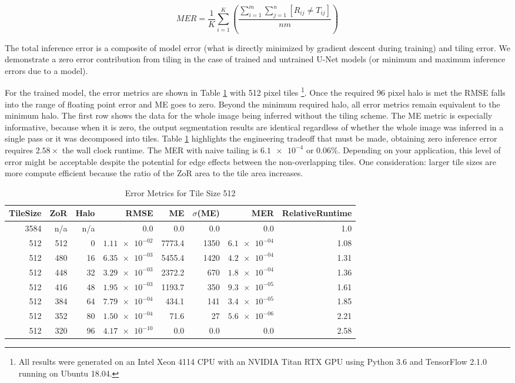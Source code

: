 \documentclass[10pt, indentfirst]{article}
\begin{document}
\begin{equation}
MER = \frac{1}{K} \sum_{i=1}^{K} \left( \frac{\sum_{i = 1}^{m} \sum_{j = 1}^{n} [ R_{ij} \neq T_{ij} ]}{nm} \right) 
\label{eq:mer}
\end{equation}

The total inference error is a composite of model error (what is directly minimized by gradient descent during training) and tiling error.
We demonstrate a zero error contribution from tiling in the case of trained and untrained U-Net models (or minimum and maximum inference errors due to a model).

For the trained model, the error metrics are shown in Table \ref{tab:tile_size_512} with 512 pixel tiles \footnote{All results were generated on an Intel Xeon 4114 CPU with an NVIDIA Titan RTX GPU using Python 3.6 and TensorFlow 2.1.0 running on Ubuntu 18.04.}.
Once the required 96 pixel halo is met the RMSE falls into the range of floating point error and ME goes to zero.
Beyond the minimum required halo, all error metrics remain equivalent to the minimum halo.
The first row shows the data for the whole image being inferred without the tiling scheme.
The ME metric is especially informative, because when it is zero, the output segmentation results are identical regardless of whether the whole image was inferred in a single pass or it was decomposed into tiles.
Table \ref{tab:tile_size_512} highlights the engineering tradeoff that must be made, obtaining zero inference error requires $2.58 \times$ the wall clock runtime.
The MER with naive tailing is $\num{6.1e-4}$ or $\num{0.06} \%$.
Depending on your application, this level of error might be acceptable despite the potential for edge effects between the non-overlapping tiles.
One consideration: larger tile sizes are more compute efficient because the ratio of the ZoR area to the tile area increases.

\begin{table}
	\centering
	\caption{Error Metrics for Tile Size 512}
	\label{tab:tile_size_512}
	\begin{tabular}{r|r|r|r|r|r|r|r}
		TileSize & ZoR & Halo & RMSE    & ME & $\sigma$(ME) & MER & RelativeRuntime \\ 
		\hline
		3584 & n/a & n/a & 0.0 & 0.0 & 0.0 & 0.0 & 1.0 \\
		512 & 512 & 0 & $\num{1.11e-02}$ & 7773.4 & 1350 & $\num{6.1e-04}$ & 1.08 \\
		512 & 480 & 16 & $\num{6.35e-03}$ & 5455.4 & 1420 & $\num{4.2e-04}$ & 1.31 \\
		512 & 448 & 32 & $\num{3.29e-03}$ & 2372.2 & 670 & $\num{1.8e-04}$ & 1.36 \\
		512 & 416 & 48 & $\num{1.95e-03}$ & 1193.7 & 350 & $\num{9.3e-05}$ & 1.61 \\
		512 & 384 & 64 & $\num{7.79e-04}$ & 434.1 & 141 &$\num{3.4e-05}$ & 1.85 \\
		512 & 352 & 80 & $\num{1.50e-04}$ & 71.6 & 27 & $\num{5.6e-06}$ & 2.21 \\
		512 & 320 & 96 & $\num{4.17e-10}$ & 0.0 & 0.0 & 0.0 & 2.58 \\
	\end{tabular}
\end{table}
\end{document}
